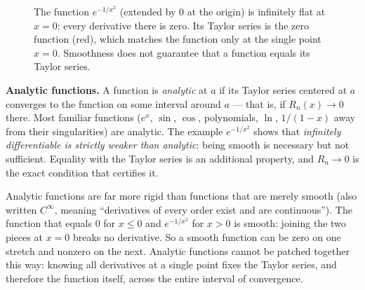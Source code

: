 \begin{figure}[H]
\centering
{}
\caption{The function $e^{-1/x^2}$ (extended by $0$ at the origin) is infinitely
flat at $x=0$: every derivative there is zero. Its Taylor series is the zero function
(red), which matches the function only at the single point $x=0$. Smoothness does not
guarantee that a function equals its Taylor series.}
\label{ch31:fig-flat}
\end{figure}

\begin{focusbox}
\textbf{Analytic functions.} A function is \emph{analytic} at $a$ if its Taylor
series centered at $a$ converges to the function on some interval around $a$ --- that
is, if $R_n(x) \to 0$ there. Most familiar functions ($e^x$, $\sin$, $\cos$,
polynomials, $\ln$, $1/(1-x)$ away from their singularities) are analytic. The
example $e^{-1/x^2}$ shows that \emph{infinitely differentiable is strictly weaker
than analytic}: being smooth is necessary but not sufficient. Equality with the
Taylor series is an additional property, and $R_n \to 0$ is the exact condition that
certifies it.
\end{focusbox}

\begin{aestheticbox}
Analytic functions are far more rigid than functions that are merely smooth (also written
$C^\infty$, meaning ``derivatives of every order exist and are continuous''). The function
that equals $0$ for $x \le 0$ and $e^{-1/x^2}$ for $x > 0$ is smooth: joining the two pieces at
$x=0$ breaks no derivative. So a smooth function can be zero on one stretch and nonzero on the
next. Analytic functions cannot be patched together this way: knowing all derivatives at a
single point fixes the Taylor series, and therefore the function itself, across the entire
interval of convergence.
\end{aestheticbox}

